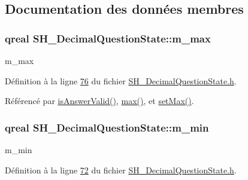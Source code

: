 \subsection{Documentation des données membres}
\hypertarget{classSH__DecimalQuestionState_a9f5763fb66d1c8c2fcdf6b5403d51579}{
\subsubsection[{m\-\_\-max}]{\setlength{\rightskip}{0pt plus 5cm}qreal S\-H\-\_\-\-Decimal\-Question\-State\-::m\-\_\-max\hspace{0.3cm}{\ttfamily [private]}}}\label{classSH__DecimalQuestionState_a9f5763fb66d1c8c2fcdf6b5403d51579}


m\-\_\-max 



Définition à la ligne \hyperlink{SH__DecimalQuestionState_8h_source_l00076}{76} du fichier \hyperlink{SH__DecimalQuestionState_8h_source}{S\-H\-\_\-\-Decimal\-Question\-State.\-h}.



Référencé par \hyperlink{classSH__DecimalQuestionState_a99f815a5101340867400f093e89f2210}{is\-Answer\-Valid()}, \hyperlink{classSH__DecimalQuestionState_a17bd2b3f5766c5379d7f057d7d4aa178}{max()}, et \hyperlink{classSH__DecimalQuestionState_a5b7b0e27a5a89424c36e1bef77fdd062}{set\-Max()}.

\hypertarget{classSH__DecimalQuestionState_a997b3644b15e2f221e5d68e2ce14a882}{
\subsubsection[{m\-\_\-min}]{\setlength{\rightskip}{0pt plus 5cm}qreal S\-H\-\_\-\-Decimal\-Question\-State\-::m\-\_\-min\hspace{0.3cm}{\ttfamily [private]}}}\label{classSH__DecimalQuestionState_a997b3644b15e2f221e5d68e2ce14a882}


m\-\_\-min 



Définition à la ligne \hyperlink{SH__DecimalQuestionState_8h_source_l00072}{72} du fichier \hyperlink{SH__DecimalQuestionState_8h_source}{S\-H\-\_\-\-Decimal\-Question\-State.\-h}.



